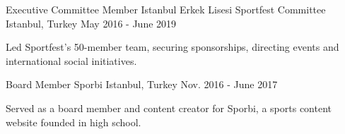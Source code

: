 
\begin{cventries}

  \cventry
    {Executive Committee Member}
    {Istanbul Erkek Lisesi Sportfest Committee}
    {Istanbul, Turkey}
    {May 2016 - June 2019}
    {
    \begin{cvitems}
        \item {Led Sportfest's 50-member team, securing sponsorships, directing events and international social initiatives.}
    \end{cvitems}
    }

  \cventry
    {Board Member}
    {Sporbi}
    {Istanbul, Turkey}
    {Nov. 2016 - June 2017}
    {
      \begin{cvitems}
        \item {Served as a board member and content creator for Sporbi, a sports content website founded in high school.}
      \end{cvitems}
    }

\end{cventries}
